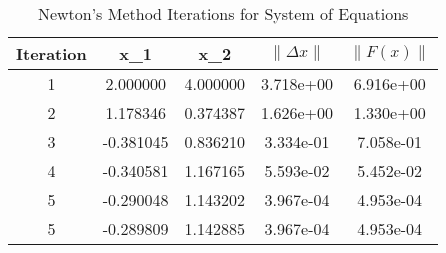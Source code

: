 \begin{table}[H]
\centering
\begin{tabular}{|c|c|c|c|c|}
\hline
Iteration & x_1 & x_2 & $\|\Delta x\|$ & $\|F(x)\|$ \\ \hline
1 & 2.000000 & 4.000000 & 3.718e+00 & 6.916e+00 \\ \hline
2 & 1.178346 & 0.374387 & 1.626e+00 & 1.330e+00 \\ \hline
3 & -0.381045 & 0.836210 & 3.334e-01 & 7.058e-01 \\ \hline
4 & -0.340581 & 1.167165 & 5.593e-02 & 5.452e-02 \\ \hline
5 & -0.290048 & 1.143202 & 3.967e-04 & 4.953e-04 \\ \hline
5 & -0.289809 & 1.142885 & 3.967e-04 & 4.953e-04 \\ \hline
\end{tabular}
\caption{Newton's Method Iterations for System of Equations}
\end{table}